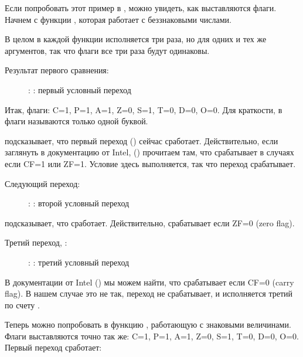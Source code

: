 \clearpage
{}
\myindex{\olly}

Если попробовать этот пример в \olly, можно увидеть, как выставляются флаги.
Начнем с функции , которая работает с беззнаковыми числами.

В целом в каждой функции \CMP исполняется три раза, но для одних и тех же аргументов, 
так что флаги все три раза будут одинаковы.

Результат первого сравнения:

\begin{figure}[H]
\centering
{}
\caption{\olly: : первый условный переход}
\label{fig:jcc_olly_unsigned_1}
\end{figure}

Итак, флаги: C=1, P=1, A=1, Z=0, S=1, T=0, D=0, O=0.
Для краткости, в \olly флаги называются только одной буквой.

\olly подсказывает, что первый переход (\JBE) сейчас сработает.
Действительно, если заглянуть в документацию от Intel, 
() прочитаем там, что \JBE срабатывает в случаях если CF=1 или ZF=1.
Условие здесь выполняется, так что переход срабатывает.

\clearpage
Следующий переход:

\begin{figure}[H]
\centering
{}
\caption{\olly: : второй условный переход}
\label{fig:jcc_olly_unsigned_2}
\end{figure}

\olly подсказывает, что \JNZ сработает.
Действительно, \JNZ срабатывает если ZF=0 (zero flag).

\clearpage
Третий переход, \JNB:

\begin{figure}[H]
\centering
{}
\caption{\olly: : третий условный переход}
\label{fig:jcc_olly_unsigned_3}
\end{figure}

В документации от Intel () мы можем найти,
что \JNB срабатывает если CF=0 (carry flag).
В нашем случае это не так, переход не срабатывает, и исполняется третий по счету \printf.

\clearpage
Теперь можно попробовать в \olly функцию , работающую с знаковыми величинами.
Флаги выставляются точно так же: C=1, P=1, A=1, Z=0, S=1, T=0, D=0, O=0.
Первый переход \JLE сработает:

